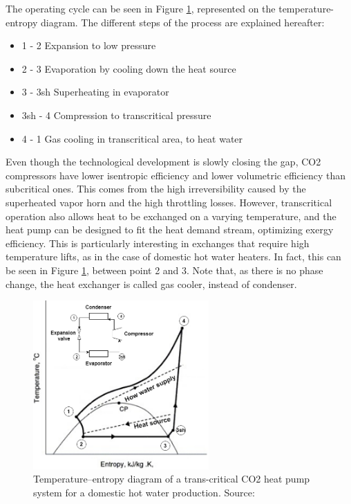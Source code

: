 \documentclass{article}
\begin{document}
The operating cycle can be seen in Figure \ref{fig:hp_CO2}, represented on the temperature-entropy diagram. The different steps of the process are explained hereafter: 
\begin{itemize}
\item 1 - 2 Expansion to low pressure
\item 2 - 3 Evaporation by cooling down the heat source
\item 3 - 3sh Superheating in evaporator
\item 3sh - 4 Compression to transcritical pressure
\item 4 - 1 Gas cooling in transcritical area, to heat water
\end{itemize}

Even though the technological development is slowly closing the gap, CO2 compressors have lower isentropic efficiency and lower volumetric efficiency than subcritical ones\cite{sarkarSimulationTranscriticalCO22006}. This comes from the high irreversibility caused by the superheated vapor horn and the high throttling losses\cite{yangTheoreticalExperimentalInvestigation2016}. 
However, transcritical operation also allows heat to be exchanged on a varying temperature, and the heat pump can be designed to fit the heat demand stream, optimizing exergy efficiency. This is particularly interesting in exchanges that require high temperature lifts, as in the case of domestic hot water heaters. In fact, this can be seen in Figure \ref{fig:hp_CO2}, between point 2 and 3. Note that, as there is no phase change, the heat exchanger is called gas cooler, instead of condenser.\\


\begin{figure}[h!]
\centering
\includegraphics[width=0.6\textwidth]{HP_cylce_CO2.png}
\caption{Temperature–entropy diagram of a trans-critical CO2 heat pump system for a domestic hot water production. Source: \cite{kimPerformanceTranscriticalCO22005}}
\label{fig:hp_CO2}
\end{figure}
\end{document}
